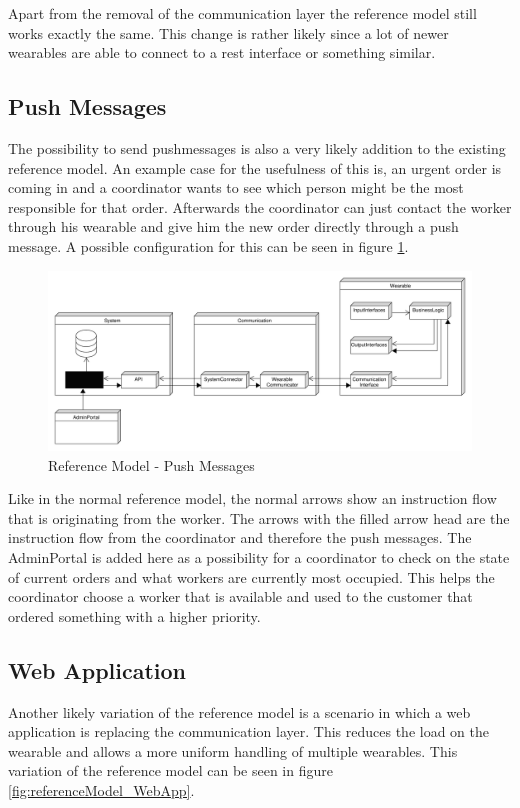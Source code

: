 Apart from the removal of the communication layer the reference model still works exactly the same. This change is rather likely since a lot of newer wearables are able to connect to a rest interface or something similar.

\subsection{Push Messages}
The possibility to send \gls{pushmessage}s is also a very likely addition to the existing reference model. An example case for the usefulness of this is, an urgent order is coming in and a coordinator wants to see which person might be the most responsible for that order. Afterwards the coordinator can just contact the worker through his wearable and give him the new order directly through a push message. A possible configuration for this can be seen in figure \ref{fig:referenceModel_PushMessages}.

\begin{figure}[H]
	\includegraphics[width=\linewidth]{images/PackageModel_ReferenceArchitecture_PushMessages}
	\caption{Reference Model - Push Messages}
	\label{fig:referenceModel_PushMessages}
\end{figure}

Like in the normal reference model, the normal arrows show an instruction flow that is originating from the worker. The arrows with the filled arrow head are the instruction flow from the coordinator and therefore the push messages. The AdminPortal is added here as a possibility for a coordinator to check on the state of current orders and what workers are currently most occupied. This helps the coordinator choose a worker that is available and used to the customer that ordered something with a higher priority.

\subsection{Web Application}
Another likely variation of the reference model is a scenario in which a web application is replacing the communication layer. This reduces the load on the wearable and allows a more uniform handling of multiple wearables. This variation of the reference model can be seen in figure \ref{fig:referenceModel_WebApp}.

